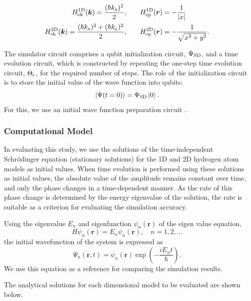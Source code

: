 \documentclass[jctc-draft.tex]{subfiles}
\begin{document}
\begin{align}
   H_{\mathrm{ek}}^{\mathrm{1D}}(\bm{k}) = \frac{(\hbar k_{\mathrm{x}})^2}{2}, \qquad &
   H_{\mathrm{ep}}^{\mathrm{1D}}(\bm{r}) = -\frac{1}{{\left| x \right|}} \label{eq:HkHp1D}\\
   H_{\mathrm{ek}}^{\mathrm{2D}}(\bm{k}) = \frac{(\hbar k_{\mathrm{x}})^2 + (\hbar k_{\mathrm{y}})^2}{2}, \qquad &
   H_{\mathrm{ep}}^{\mathrm{2D}}(\bm{r}) = -\frac{1}{\sqrt{x^2+y^2}}. \label{eq:HkHp2D}
\end{align}

The simulator circuit comprises a qubit initialization circuit, $\Psi_{\mathrm{SD}}$, and a
time evolution circuit, which is constructed by repeating the one-step time
evolution circuit, $\Theta_{\mathrm{e}}$, for the required number of steps. The role of the
initialization circuit is to store the initial value of the wave function into
qubits:
\begin{equation}
\ket{\Psi(t=0)} = \Psi_{\mathrm{SD}} \ket{0}.
\end{equation}
For this, we use an initial wave function preparation circuit \cite[Sec.
2.2]{takahashi2024.doi:10.1021/acs.jctc.4c00708}.

\subsubsection{Computational Model}
In evaluating this study, we use the solutions of the time-independent
Schrödinger equation (stationary solutions) for the 1D and 2D hydrogen atom
models as initial values. When time evolution is performed using these solutions
as initial values, the absolute value of the amplitude remains constant over
time, and only the phase changes in a time-dependent manner. As the rate of this
phase change is determined by the energy eigenvalue of the solution, the rate is
suitable as a criterion for evaluating the simulation accuracy.

Using the eigenvalue $E_n$ and eigenfunction $\psi_n(\bm{r})$ of the eigen value
equation,
\begin{equation}
H\psi_n(\bm{r})=E_n\psi_n(\bm{r}),\quad n=1,2,\ldots
\end{equation}
the initial wavefunction of the system is expressed as
\begin{equation}
\Psi_n(\bm{r},t)=\psi_n(\bm{r})\exp\left(-\frac{iE_nt}{\hbar}\right).
\end{equation}
We use this equation as a reference for comparing the simulation results.

The analytical solutions for each dimensional model to be evaluated are shown below.
\end{document}

